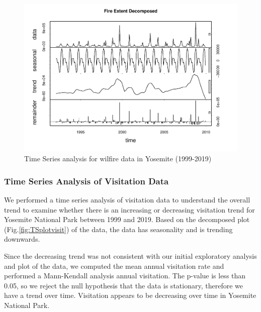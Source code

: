 \documentclass[
  12pt,
]{article}
\begin{document}
\begin{figure}
\centering
\includegraphics{CodeFinal_files/figure-latex/TSplotfire-1.pdf}
\caption{\label{fig:TSplotfire}Time Series analysis for wilfire data in Yosemite (1999-2019)}
\end{figure}

\hypertarget{time-series-analysis-of-visitation-data}{%
\subsubsection{Time Series Analysis of Visitation Data}\label{time-series-analysis-of-visitation-data}}

We performed a time series analysis of visitation data to understand the overall trend to examine whether there is an increasing or decreasing visitation trend for Yosemite National Park between 1999 and 2019. Based on the decomposed plot (Fig.\ref{fig:TSplotvisit}) of the data, the data has seasonality and is trending downwards.

Since the decreasing trend was not consistent with our initial exploratory analysis and plot of the data, we computed the mean annual visitation rate and performed a Mann-Kendall analysis annual visitation. The p-value is less than 0.05, so we reject the null hypothesis that the data is stationary, therefore we have a trend over time. Visitation appears to be decreasing over time in Yosemite National Park.
\end{document}

